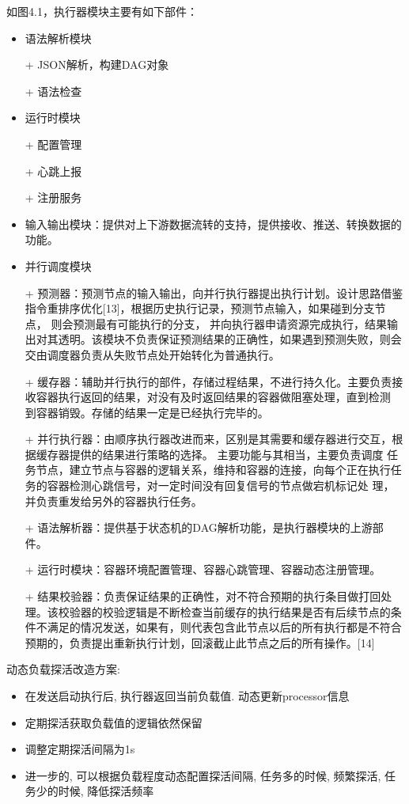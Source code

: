 如图4.1，执行器模块主要有如下部件：
\begin{itemize}
    \item 语法解析模块
    \item[+] JSON解析，构建DAG对象
    \item[+] 语法检查
    \item 运行时模块
    \item[+] 配置管理
    \item[+] 心跳上报
    \item[+] 注册服务
    \item 输入输出模块：提供对上下游数据流转的支持，提供接收、推送、转换数据的功能。
    \item 并行调度模块
    \item[+] 预测器：预测节点的输入输出，向并行执行器提出执行计划。设计思路借鉴指令重排序优化[13]，根据历史执行记录，预测节点输入，如果碰到分支节点，
    则会预测最有可能执行的分支， 并向执行器申请资源完成执行，结果输出对其透明。该模块不负责保证预测结果的正确性，如果遇到预测失败，则会
    交由调度器负责从失败节点处开始转化为普通执行。
    \item[+] 缓存器：辅助并行执行的部件，存储过程结果，不进行持久化。主要负责接收容器执行返回的结果，对没有及时返回结果的容器做阻塞处理，直到检测
    到容器销毁。存储的结果一定是已经执行完毕的。
    \item[+] 并行执行器：由顺序执行器改进而来，区别是其需要和缓存器进行交互，根据缓存器提供的结果进行策略的选择。 主要功能与其相当，主要负责调度
    任务节点，建立节点与容器的逻辑关系，维持和容器的连接，向每个正在执行任务的容器检测心跳信号，对一定时间没有回复信号的节点做宕机标记处
    理，并负责重发给另外的容器执行任务。
    \item[+] 语法解析器：提供基于状态机的DAG解析功能，是执行器模块的上游部件。
    \item[+] 运行时模块：容器环境配置管理、容器心跳管理、容器动态注册管理。
    \item[+] 结果校验器：负责保证结果的正确性，对不符合预期的执行条目做打回处理。该校验器的校验逻辑是不断检查当前缓存的执行结果是否有后续节点的条
    件不满足的情况发送，如果有，则代表包含此节点以后的所有执行都是不符合预期的，负责提出重新执行计划，回滚截止此节点之后的所有操作。[14]

\end{itemize}

动态负载探活改造方案:
\begin{itemize}
    \item 在发送启动执行后, 执行器返回当前负载值. 动态更新processor信息
    \item 定期探活获取负载值的逻辑依然保留
    \item 调整定期探活间隔为1s
    \item 进一步的, 可以根据负载程度动态配置探活间隔, 任务多的时候, 频繁探活, 任务少的时候, 降低探活频率
\end{itemize}



